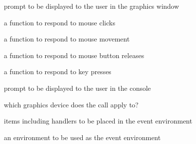 %
\begin{Arguments}
\begin{ldescription}
\item[\code{prompt}] prompt to be displayed to the user in the graphics window
\item[\code{onMouseDown}] a function to respond to mouse clicks
\item[\code{onMouseMove}] a function to respond to mouse movement
\item[\code{onMouseUp}] a function to respond to mouse button releases
\item[\code{onKeybd}] a function to respond to key presses
\item[\code{consolePrompt}] prompt to be displayed to the user in the console
\item[\code{which}] which graphics device does the call apply to?
\item[\code{...}] items including handlers to be placed in the event environment
\item[\code{env}] an environment to be used as the event environment
\end{ldescription}
\end{Arguments}
%

